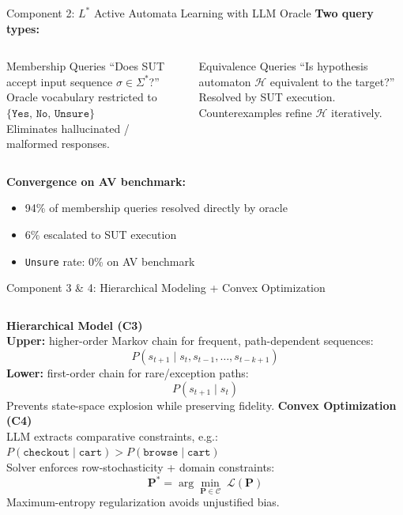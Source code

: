 \documentclass[aspectratio=169,10pt]{beamer}
\newcommand{\pos}[1]{\textcolor{positive}{#1}}
\begin{document}
\begin{frame}{Component 2: $L^*$ Active Automata Learning with LLM Oracle}
  \textbf{Two query types:}
  \begin{columns}[T]
      \begin{block}{Membership Queries}
        ``Does SUT accept input sequence $\sigma \in \Sigma^*$?''\\[4pt]
        Oracle vocabulary restricted to $\{\texttt{Yes},\, \texttt{No},\, \texttt{Unsure}\}$\\
        Eliminates hallucinated / malformed responses.
      \end{block}
      \begin{block}{Equivalence Queries}
        ``Is hypothesis automaton $\mathcal{H}$ equivalent to the target?''\\[4pt]
        Resolved by SUT execution. Counterexamples refine $\mathcal{H}$ iteratively.
      \end{block}
  \end{columns}
  \vspace{0.4em}
  \textbf{Convergence on AV benchmark:}
  \begin{itemize}
    \item \pos{94\%} of membership queries resolved directly by oracle
    \item \pos{6\%} escalated to SUT execution
    \item \texttt{Unsure} rate: 0\% on AV benchmark
  \end{itemize}
\end{frame}

\begin{frame}{Component 3 \& 4: Hierarchical Modeling + Convex Optimization}
  \begin{columns}[T]
      \textbf{Hierarchical Model (C3)}\\[4pt]
      \textbf{Upper:} higher-order Markov chain for frequent, path-dependent sequences:
      \[ P(s_{t+1} \mid s_t, s_{t-1}, \ldots, s_{t-k+1}) \]
      \textbf{Lower:} first-order chain for rare/exception paths:
      \[ P(s_{t+1} \mid s_t) \]
      Prevents state-space explosion while preserving fidelity.
      \textbf{Convex Optimization (C4)}\\[4pt]
      LLM extracts comparative constraints, e.g.:\\
      $P(\texttt{checkout} \mid \texttt{cart}) > P(\texttt{browse} \mid \texttt{cart})$\\[4pt]
      Solver enforces row-stochasticity + domain constraints:
      \[ \mathbf{P}^{*} = \arg\min_{\mathbf{P} \in \mathcal{C}}\; \mathcal{L}(\mathbf{P}) \]
      Maximum-entropy regularization avoids unjustified bias.
  \end{columns}
\end{frame}
\end{document}
